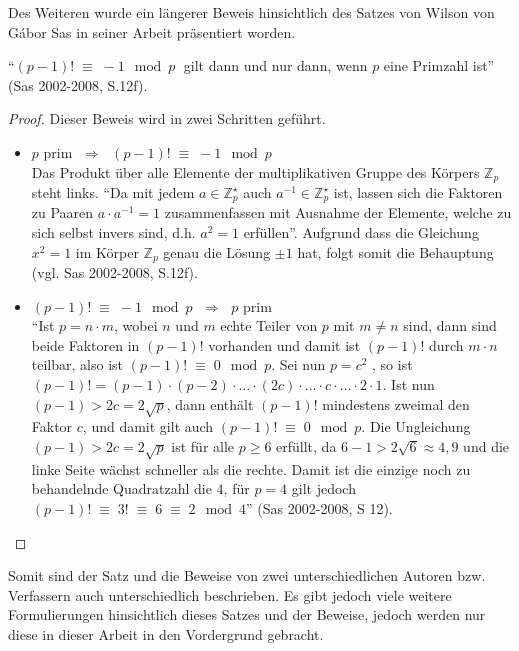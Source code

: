 Des Weiteren wurde ein längerer Beweis hinsichtlich
des Satzes von Wilson von Gábor Sas in seiner Arbeit
präsentiert worden.

\begin{theorem}[Wilson]
``$(p-1)! \;\equiv\; -1\mod p\;$ gilt dann und nur dann,
wenn $p$ eine Primzahl ist'' (Sas 2002-2008, S.12f).
\end{theorem}
\vspace{-.7cm}

\begin{proof}
  Dieser Beweis wird in zwei Schritten geführt.
  \begin{itemize}
    \item $p$ prim $\;\Rightarrow\;$ $(p-1)! \;\equiv\; -1 \mod p$\\
          Das Produkt über alle Elemente der multiplikativen Gruppe
          des Körpers $\mathbb{Z}_{p}$ steht links. ``Da mit jedem
          $a \in \mathbb{Z}_{p}^{\star}$ auch
          $a^{-1}\in\mathbb{Z}_{p}^{\star}$ ist, lassen sich die
          Faktoren zu Paaren $a\cdot a^{-1} = 1$ zusammenfassen
          mit Ausnahme der Elemente, welche zu sich selbst invers
          sind, d.h. $a^2 = 1$ erfüllen''. Aufgrund dass die
          Gleichung $x^2 = 1$ im Körper $\mathbb{Z}_{p}$ genau
          die Lösung $\pm 1$ hat, folgt somit die Behauptung
          (vgl. Sas 2002-2008, S.12f).
          
    \item $(p-1)! \;\equiv\; -1\mod p$ $\;\Rightarrow\;$ $p$ prim\\
          ``Ist $p=n\cdot m$, wobei $n$ und $m$ echte Teiler von $p$
          mit $m \neq n$ sind, dann sind beide Faktoren in
          $(p-1)!$ vorhanden und damit ist $(p-1)!$ durch $m\cdot n$
          teilbar, also ist $(p-1)! \;\equiv\; 0 \mod p$.
          Sei nun $p=c^2$ , so ist
          $(p-1)! = (p-1)\cdot (p-2)\cdot \dotsc \cdot (2c)\cdot \dotsc
          \cdot c \cdot \dotsc \cdot 2 \cdot 1$.
          Ist nun $(p-1) > 2c = 2\sqrt{p}$,
          dann enthält $(p-1)!$ mindestens zweimal den Faktor $c$,
          und damit gilt auch $(p-1)! \;\equiv\; 0 \mod p$.
          Die Ungleichung $(p-1) > 2c = 2 \sqrt{p}$ ist für alle
          $p \geq 6$ erfüllt, da $6 − 1 > 2 \sqrt{6} \approx 4,9$
          und die linke Seite wächst schneller als die rechte.
          Damit ist die einzige noch zu behandelnde Quadratzahl
          die $4$, für $p = 4$ gilt jedoch $(p-1)! \;\equiv\;
          3! \;\equiv\; 6 \;\equiv\; 2 \mod 4$''
          (Sas 2002-2008, S 12).
  \end{itemize}
\end{proof}

Somit sind der Satz und die Beweise von zwei unterschiedlichen
Autoren bzw. Verfassern auch unterschiedlich beschrieben.
Es gibt jedoch viele weitere Formulierungen hinsichtlich dieses
Satzes und der Beweise, jedoch werden nur diese in dieser Arbeit
in den Vordergrund gebracht.
